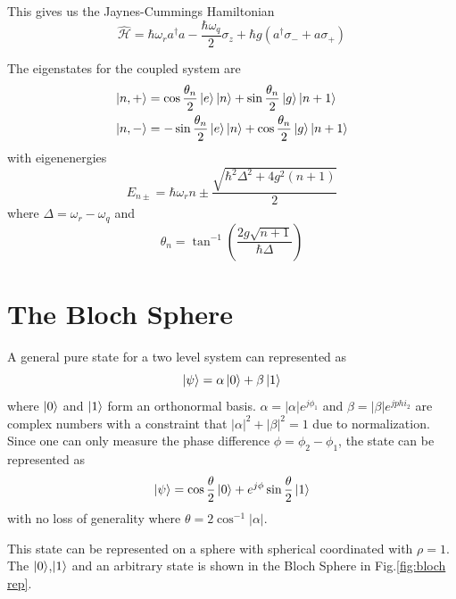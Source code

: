 This gives us the Jaynes-Cummings Hamiltonian
\begin{equation}
\hat{\mathcal{H}}=\hbar\omega_ra^\dag a-\frac{\hbar\omega_q}{2}\sigma_z+\hbar g(a^\dag\sigma_-+a\sigma_+)
\end{equation}

The eigenstates for the coupled system are
\begin{subequations}
\label{eqn:coupled eigenstates}
\begin{align}
\ket{n,+} &= \cos\frac{\theta_n}{2}\ket{e}\ket{n}+\sin\frac{\theta_n}{2}\ket{g}\ket{n+1}\\
\ket{n,-} &= -\sin\frac{\theta_n}{2}\ket{e}\ket{n}+\cos\frac{\theta_n}{2}\ket{g}\ket{n+1}
\end{align}
\end{subequations}
with eigenenergies
\begin{equation}
E_{n\pm}=\hbar\omega_r n\pm\frac{\sqrt{\hbar^2\Delta^2+4g^2(n+1)}}{2}
\end{equation}
where $\Delta=\omega_r-\omega_q$ and
\begin{equation}
\theta_n = \tan^{-1}\left(\frac{2g\sqrt{n+1}}{\hbar \Delta}\right)
\end{equation}

\section{The Bloch Sphere}

A general pure state for a two level system can represented as
\begin{equation}
\ket{\psi} = \alpha\ket{0}+\beta\ket{1}
\end{equation}
where $\ket{0}$ and $\ket{1}$ form an orthonormal basis. $\alpha=|\alpha|e^{j\phi_1}$ and $\beta=|\beta|e^{jphi_2}$ are complex numbers with a constraint that $|\alpha|^2+|\beta|^2 = 1$ due to normalization. Since one can only measure the phase difference $\phi = \phi_2-\phi_1$, the state can be represented as
\begin{equation}
\ket{\psi} = \cos\frac{\theta}{2}\ket{0}+e^{j\phi}\sin\frac{\theta}{2}\ket{1}
\end{equation}
with no loss of generality where $\theta= 2\cos^{-1}|\alpha|$.

This state can be represented on a sphere with spherical coordinated with $\rho = 1$. The $\ket{0}$,$\ket{1}$ and an arbitrary state is shown in the Bloch Sphere in Fig.\ref{fig:bloch rep}.

